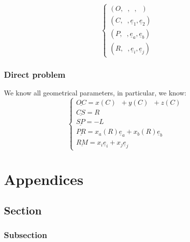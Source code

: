 \documentclass[a4paper,11pt,twoside,titlepage,openright]{book}
\numberwithin{equation}{section}
\newcommand{\ud}[1]{\underline{#1}}
\newcommand{\e}[1]{\underline{e}_{#1}}
\newcommand{\lt}{\left}
\newcommand{\rt}{\right}
\DeclareMathOperator{\ex}{\underline{e}_x}
\DeclareMathOperator{\ey}{\underline{e}_y}
\DeclareMathOperator{\ez}{\underline{e}_z}
\DeclareMathOperator{\nout}{\underline{n}_{out}}
\DeclareMathOperator{\np}{\underline{n}_{P}}
\begin{document}
$$
\lt\{
	\begin{array}{lll}
		(O, \ex, \ey, \ez)\\
		(C, \nout, \e{1}, \e{2})\\
		(P, \np, \e{a}, \e{b})\\
		(R, \np, \e{i}, \e{j})
	\end{array}
\rt.
$$

\subsection{Direct problem}

We know all geometrical parameters, in particular, we know:
$$
\lt\{
	\begin{array}{lll}
		\ud{OC} = x(C)\ex + y(C)\ey + z(C)\ez\\
		\ud{CS} = R\nout\\
		\ud{SP} = -L\nout\\
		\ud{PR} = x_a(R)\e{a} + x_b(R)\e{b}\\
		\ud{RM} = x_i\e{i} + x_j\e{j}
	\end{array}
\rt.
$$






\appendix
\chapter{Appendices}

\section{Section}
\subsection{Subsection}
\end{document}
